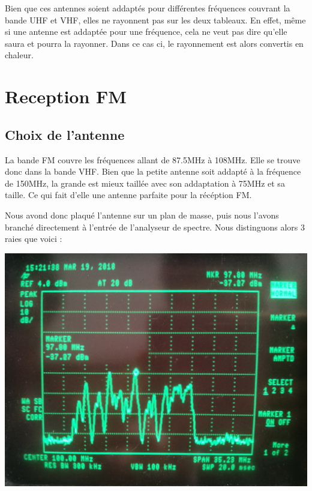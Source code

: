 \documentclass[a4paper,12pt]{report}            %
\begin{document}
Bien que ces antennes soient addaptés pour différentes fréquences couvrant la bande UHF et VHF, elles ne rayonnent 
pas sur les deux tableaux. En effet, même si une antenne est addaptée pour une fréquence, cela ne veut pas dire 
qu'elle saura et pourra la rayonner. Dans ce cas ci, le rayonnement est alors convertis en chaleur.\\


\chapter{Reception FM}

\section{Choix de l'antenne}

La bande FM couvre les fréquences allant de 87.5MHz à 108MHz. Elle se trouve donc dans la bande VHF. 
Bien que la petite antenne soit addapté à la fréquence de 150MHz, la grande est mieux taillée 
avec son addaptation à 75MHz et sa taille. Ce qui fait d'elle une antenne parfaite pour la récéption FM.

Nous avond donc plaqué l'antenne sur un plan de masse, puis nous l'avons branché directement à l'entrée de
l'analyseur de spectre. Nous distinguons alors 3 raies que voici :

\begin{center}\includegraphics[scale = 0.09]{pic/spectre_FM.jpg}\\ \end{center}
\end{document}
